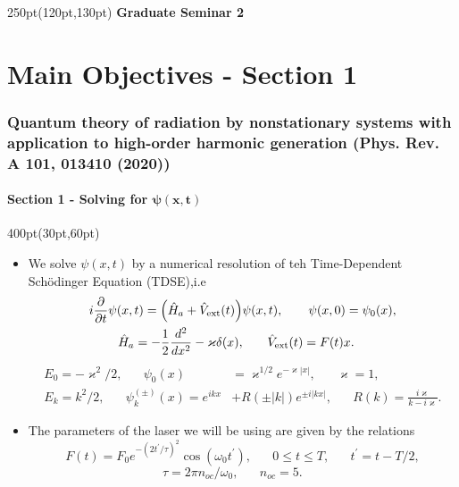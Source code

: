 
\begin{frame}
\frametitle{}
	\framesubtitle{}

\begin{textblock*}{250pt}(120pt,130pt)
\Huge
\textbf{Graduate Seminar 2}
\end{textblock*}

\end{frame}


\section{Main Objectives - Section 1}


\begin{frame}
\frametitle{Quantum theory of radiation by nonstationary systems 
	with application to high-order harmonic generation
        (Phys. Rev. A 101, 013410 (2020))}
        \framesubtitle{Section 1 - Solving for $\boldsymbol{\psi(x,t)}$}
\footnotesize
\begin{textblock*}{400pt}(30pt,60pt)
\begin{itemize}
\item We solve $\psi(x,t)$ by a numerical resolution of 
	teh Time-Dependent Sch\"odinger Equation (TDSE),i.e 
\begin{align}
	i\frac{\partial}{\partial t}\psi(x,t)
	   = \left( \hat{H}_a + \hat{V}_{\rm ext}(t)\right)  &	
	   \psi(x,t),   \hspace{20pt}\psi(x,0)=\psi_0(x),  \label{eqn:step_1d} \\
	\hat{H}_a = -\frac{1}{2}\frac{d^2}{dx^2} - \varkappa\delta(x),  &\hspace{20pt}
	\hat{V}_{\rm ext}(t) = F(t)x.
\end{align}
\begin{align}
  E_0 = -\varkappa^2/2,\hspace{20pt}
	\psi_{0}(x) & = \varkappa^{1/2}e^{-\varkappa|x|}, \hspace{20pt}
  \varkappa = 1,       \label{eqn:bound_state} \\
  E_k = k^2/2,\hspace{20pt}
	\psi_k^{(\pm)}(x) = e^{ikx} & + R(\pm|k|)e^{\pm i|kx|}, \hspace{20pt}
   R(k) = \frac{i\varkappa}{k-i \varkappa}. \label{eqn:inout_states}
\end{align}
\vspace{10pt}
\item The parameters of the laser we will be using 
are given by the relations
\begin{equation}
  F(t) = F_0 e^{-(2t^\prime/\tau)^2}\cos(\omega_0 t^\prime),
\hspace{20pt}  0 \leqslant t \leqslant T,
\hspace{20pt}  t^{\prime} = t - T/2,
\end{equation}
\begin{equation}
  \tau  = 2\pi n_{oc}/\omega_0,  \hspace{20pt}
  n_{oc} = 5. \hspace{20pt}
\end{equation}
\end{itemize}


\end{textblock*}
\end{frame}
